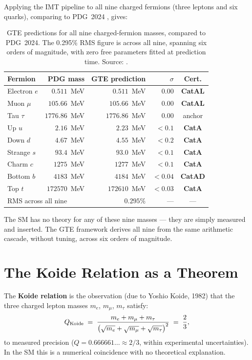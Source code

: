 \documentclass[11pt,a4paper]{article}
\newcommand{\term}[1]{\textbf{#1}}
\newcommand{\CatAL}{\textbf{CatAL}}
\newcommand{\CatAD}{\textbf{CatAD}}
\newcommand{\CatA}{\textbf{CatA}}
\begin{document}
Applying the IMT pipeline to all nine charged fermions (three leptons and six
quarks), comparing to PDG~2024 \cite{SpivackSM}, gives:

\begin{table}[htbp]
\centering
\caption{GTE predictions for all nine charged-fermion masses, compared to
PDG~2024.  The 0.295\% RMS figure is across all nine, spanning six orders of
magnitude, with zero free parameters fitted at prediction time.
Source: \cite{SpivackSM, SpivackGTECompleteFramework}.}
\label{tab:masses}
\setlength{\tabcolsep}{5pt}
\begin{tabular}{lrrrc}
\toprule
Fermion & PDG mass & GTE prediction & $\sigma$ & Cert. \\
\midrule
Electron $e$ & $0.511$~MeV & $0.511$~MeV & $0.00$ & \CatAL \\
Muon $\mu$ & $105.66$~MeV & $105.66$~MeV & $0.00$ & \CatAL \\
Tau $\tau$ & $1776.86$~MeV & $1776.86$~MeV & $0.00$ & anchor \\
Up $u$ & $2.16$~MeV & $2.23$~MeV & $<0.1$ & \CatA \\
Down $d$ & $4.67$~MeV & $4.55$~MeV & $<0.2$ & \CatA \\
Strange $s$ & $93.4$~MeV & $93.0$~MeV & $<0.1$ & \CatA \\
Charm $c$ & $1275$~MeV & $1277$~MeV & $<0.1$ & \CatA \\
Bottom $b$ & $4183$~MeV & $4184$~MeV & $<0.04$ & \CatAD \\
Top $t$ & $172570$~MeV & $172610$~MeV & $<0.03$ & \CatA \\
\midrule
\multicolumn{2}{l}{RMS across all nine} & $0.295\%$ & --- & --- \\
\bottomrule
\end{tabular}
\end{table}

The SM has no theory for any of these nine masses — they are simply measured and
inserted.  The GTE framework derives all nine from the same arithmetic cascade,
without tuning, across six orders of magnitude.

\section{The Koide Relation as a Theorem}
\label{sec:koide}

The \term{Koide relation} is the observation (due to Yoshio Koide, 1982) that
the three charged lepton masses $m_e$, $m_\mu$, $m_\tau$ satisfy:
\begin{equation}
  Q_{\rm Koide} \;=\;
  \frac{m_e + m_\mu + m_\tau}{\bigl(\sqrt{m_e} + \sqrt{m_\mu} + \sqrt{m_\tau}\bigr)^2}
  \;=\; \frac{2}{3},
  \label{eq:koide}
\end{equation}
to measured precision ($Q = 0.666661\ldots \approx 2/3$, within experimental
uncertainties).  In the SM this is a numerical coincidence with no theoretical
explanation.
\end{document}
